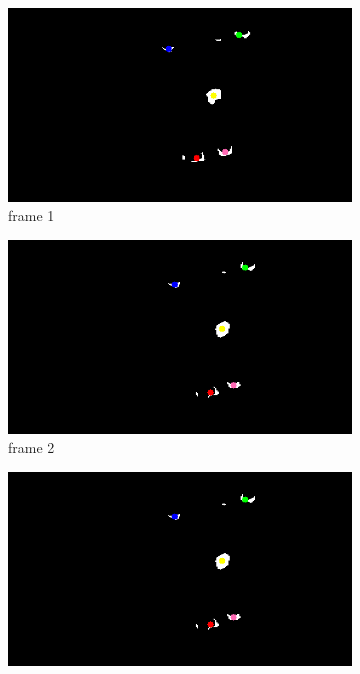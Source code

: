 \documentclass[12pt,a4paper]{article}
\begin{document}
      \begin{figure}[H]
        \centering
        \begin{subfigure}[H]{0.32\textwidth}
          \includegraphics[width=\linewidth]{192}
          \caption{frame 1}
        \end{subfigure}
        \begin{subfigure}[H]{0.32\textwidth}
          \includegraphics[width=\linewidth]{193}
          \caption{frame 2}
        \end{subfigure}
        \begin{subfigure}[H]{0.32\textwidth}
          \includegraphics[width=\linewidth]{193}

\end{subfigure}
\end{figure}
\end{document}
